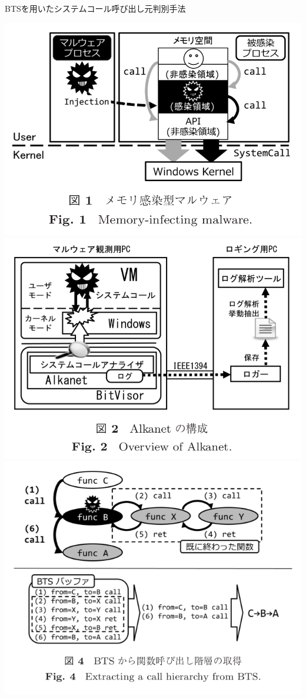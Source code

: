 \begin{frame}[plain,t]
  {BTSを用いたシステムコール呼び出し元判別手法}
  \begin{minipage}[t]{\linewidth}
      \includegraphics[height=0.15\textheight,keepaspectratio]{img/Target.png}
      \includegraphics[height=0.15\textheight,keepaspectratio]{img/SystemOverview.png}
      \includegraphics[height=0.15\textheight,keepaspectratio]{img/BTS.png}

\end{minipage}
\end{frame}
